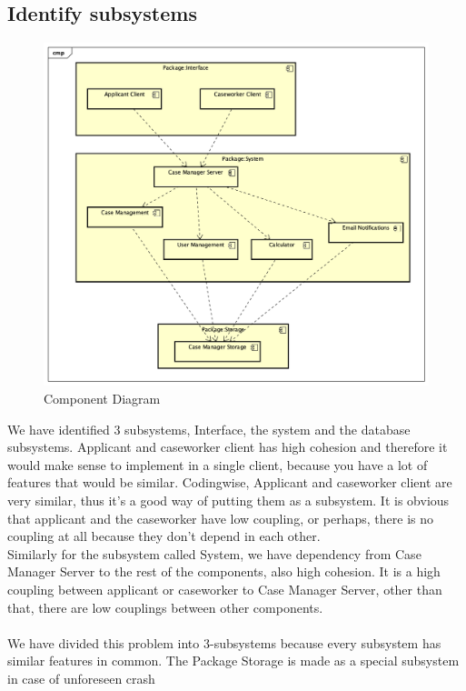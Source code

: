 \newpage
\subsection{Identify subsystems}
\begin{figure}[htb!]
    \centering
    \includegraphics[width=\textwidth]{img/cmp-diagram.png}
    \caption{Component Diagram}
\end{figure}
We have identified 3 subsystems, Interface, the system and the database subsystems.
Applicant and caseworker client has high cohesion and therefore it would make sense to implement in a single client, because you have a lot of features that would be similar. Codingwise, Applicant and caseworker client are very similar, thus it's a good way of putting them as a subsystem. It is obvious that applicant and the caseworker have low coupling, or perhaps, there is no coupling at all because they don't depend in each other. \\
Similarly for the subsystem called System, we have dependency from Case Manager Server to the rest of the components, also high cohesion. 
It is a high coupling between applicant or caseworker to Case Manager Server, other than that, there are  low couplings between other components.\\
\\
We have divided this problem into 3-subsystems because  every subsystem has similar features in common. The Package Storage is made as a special subsystem in case of  unforeseen crash





  
